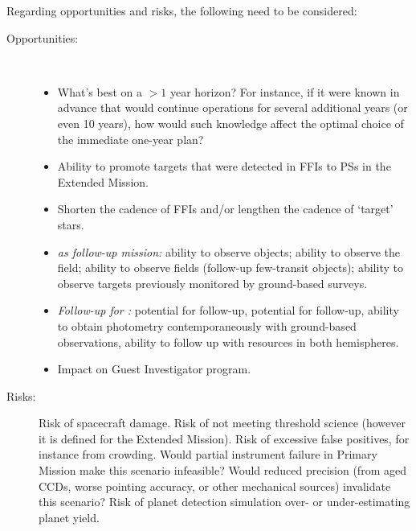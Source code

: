 Regarding opportunities and risks, the following need to be considered:
\begin{description}
	\item[Opportunities:]\ 
	\begin{itemize}
	\item What's best on a $>1$ year horizon? For instance, if it were known in advance
	that \tess would continue operations for several additional years (or even 10
	years), how would such knowledge affect the optimal choice of the immediate
	one-year plan?
		\item Ability to promote targets that were detected in FFIs to PSs in the Extended Mission.
		\item Shorten the cadence of FFIs and/or lengthen the cadence of `target' 
		stars.
		\item \textit{\tess as follow-up mission:} ability to
                  observe \corot objects; ability to observe the \kepler
                  field;
                  ability to observe \ktwo fields (follow-up \ktwo
                  few-transit objects); ability to observe targets
                  previously monitored by ground-based surveys.
		\item \textit{Follow-up for \tess\!:} 
		potential for \jwst follow-up, 
		potential for \cheops follow-up,
		ability to obtain \tess photometry contemporaneously with ground-based observations,
		ability to follow up with resources in both hemispheres.
		\item Impact on Guest Investigator program.
	\end{itemize}
	
	\item[Risks:] 
	Risk of spacecraft damage. 
	Risk of not meeting threshold science (however it is defined for the Extended Mission).
	Risk of excessive false positives, for instance from crowding. 
	Would partial instrument failure in Primary Mission make this scenario infeasible? 
	Would reduced precision (from aged CCDs, worse pointing accuracy, or other mechanical sources) invalidate this scenario? 
	Risk of planet detection simulation over- or under-estimating planet yield.
\end{description}
